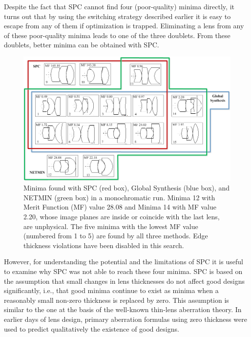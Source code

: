 Despite the fact that SPC cannot find four (poor-quality) minima directly, it turns out that by using the switching strategy described earlier it is easy to escape from any of them if optimization is trapped. Eliminating a lens from any of these poor-quality minima leads to one of the three doublets. From these doublets, better minima can be obtained with SPC.
\begin{figure}[h!]
    \centering
    \includegraphics[width=1.0\textwidth]{chapter-3/figures/TripletMoNoNetwork.png}
    \caption{Minima found with SPC (red box), Global Synthesis (blue box), and NETMIN (green box) in a monochromatic run. Minima 12 with Merit Function (MF) value 28.08 and Minima 14 with MF value 2.20, whose image planes are inside or coincide with the last lens, are unphysical. The five minima with the lowest MF value (numbered from 1 to 5) are found by all three methods. Edge thickness violations have been disabled in this search.}
    \label{fig:TripletMonoNetwork}
\end{figure}

However, for understanding the potential and the limitations of SPC it is useful to examine why SPC was not able to reach these four minima. SPC is based on the assumption that small changes in lens thicknesses do not affect good designs significantly, i.e., that good minima continue to exist as minima when a reasonably small non-zero thickness is replaced by zero. This assumption is similar to the one at the basis of the well-known thin-lens aberration theory. In earlier days of lens design, primary aberration formulas using zero thickness were used to predict qualitatively the existence of good designs.

